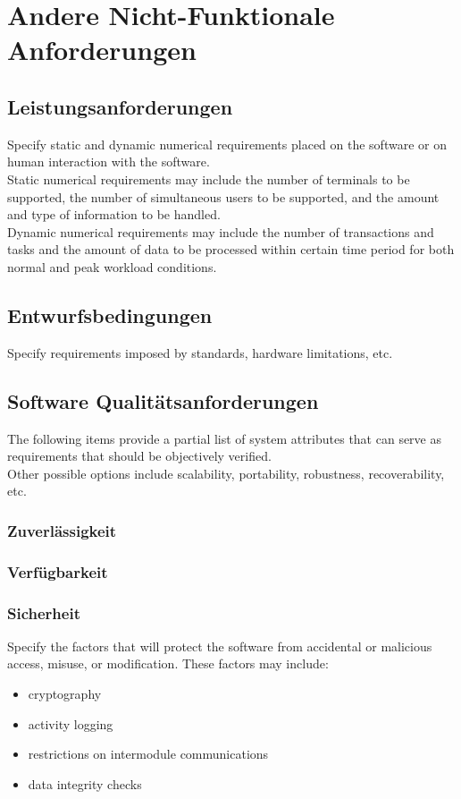 \newpage

\section{Andere Nicht-Funktionale Anforderungen}

\subsection{Leistungsanforderungen}
Specify static and dynamic numerical requirements placed on the software or on human interaction with the software. \\[-0.3cm]

\noindent Static numerical requirements may include the number of terminals to be supported, the number of simultaneous users to be supported, and the amount and type of information to be handled. \\[-0.3cm]

\noindent Dynamic numerical requirements may include the number of transactions and tasks and the amount of data to be processed within certain time period for both normal and peak workload conditions.

\subsection{Entwurfsbedingungen}
Specify requirements imposed by standards, hardware limitations, etc.

\subsection{Software Qualitätsanforderungen}
The following items provide a partial list of system attributes that can serve as requirements that should be objectively verified. \\[0.1cm]
Other possible options include scalability, portability, robustness, recoverability, etc.

\subsubsection{Zuverlässigkeit}

\subsubsection{Verfügbarkeit}

\subsubsection{Sicherheit}
Specify the factors that will protect the software from accidental or malicious access, misuse, or modification. These factors may include:
\begin{itemize}
	\item cryptography
	\item activity logging
	\item restrictions on intermodule communications
	\item data integrity checks
\end{itemize}


